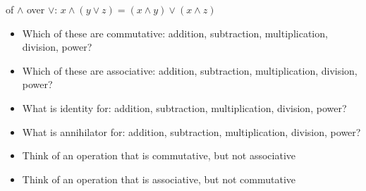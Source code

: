  of $\land$ over $\lor$:  $x \land (y \lor z) = (x \land y) \lor (x \land z)$
\begin{question}
    \begin{itemize}\textit{(make a table)}
        \item Which of these are commutative: addition, subtraction, multiplication, division, power?
        \item Which of these are associative: addition, subtraction, multiplication, division, power?
        \item What is identity for: addition, subtraction, multiplication, division, power?
        \item What is annihilator for: addition, subtraction, multiplication, division, power?
    \end{itemize}
\end{question}
\begin{question}
    \begin{itemize}
        \item Think of an operation that is commutative, but not associative
        \item Think of an operation that is associative, but not commutative
    \end{itemize}
\end{question}


